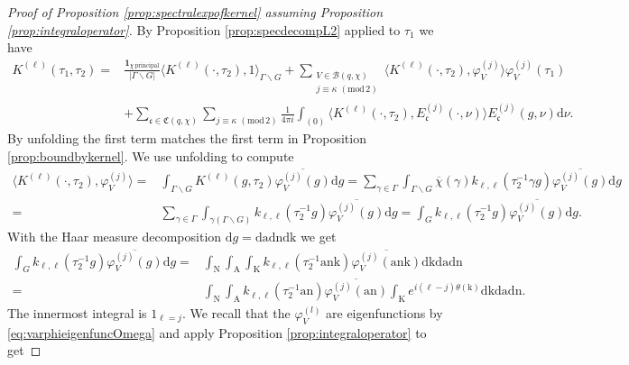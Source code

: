\documentclass[12pt]{amsart}
\theoremstyle{definition}
\theoremstyle{remark}
\numberwithin{equation}{section}
\newcommand{\1}{{\mathbf 1}}
\renewcommand{\k}{\mathrm{k}}
\renewcommand{\d}{\mathrm d}
\renewcommand{\pmod}[1]{\,\,(\mathrm{mod}\,{#1})}
\begin{document}
\begin{proof}[Proof of Proposition \ref{prop:spectralexpofkernel} assuming Proposition \ref{prop:integraloperator}]
 By Proposition \ref{prop:specdecompL2} applied to $\tau_1$ we have
\begin{align}\nonumber
  K^{(\ell)}(\tau_1,\tau_2) = &  \frac{\mathbf{1}_{\chi \,\mathrm{principal}}}{|\Gamma \backslash G|} \langle K^{(\ell)}(\cdot,\tau_2) ,1 \rangle_{\Gamma \backslash G} + \sum_{\substack{V\in \mathcal{B}(q,\chi)\\ j \equiv \kappa \pmod{2}}}  \langle    K^{(\ell)}(\cdot,\tau_2), \varphi_V^{(j)} \rangle  \varphi_V^{(j)}(\tau_1)   \\
 \label{eq:prop71proof1} &+\sum_{\mathfrak{c}\in \mathfrak{C}(q,\chi)} \sum_{j \equiv \kappa \pmod{2}} \frac{1}{4 \pi i} \int_{(0)} \langle  K^{(\ell)}(\cdot,\tau_2), E^{(j)}_{\mathfrak{c}}(\cdot,\nu) \rangle E^{(j)}_{\mathfrak{c}}(g,\nu) \d \nu.
\end{align}
By unfolding the first term matches the first term in Proposition \ref{prop:boundbykernel}. We use unfolding to compute
\begin{align*}
    \langle    K^{(\ell)}(\cdot,\tau_2), \varphi_V^{(j)} \rangle =& \int_{\Gamma \backslash G}  K^{(\ell)}(g,\tau_2) \overline{\varphi_V^{(j)}(g)} \d g = \sum_{\gamma \in \Gamma} \int_{\Gamma \backslash G} \overline{\chi}(\gamma) k_{\ell,\ell}(\tau_2^{-1} \gamma g) \overline{\varphi_V^{(j)}(g)} \d g \\
=& \sum_{\gamma \in \Gamma} \int_{\gamma (\Gamma \backslash G)}  k_{\ell,\ell}(\tau_2^{-1}  g) \overline{\varphi_V^{(j)}(g)} \d g =\int_{ G}  k_{\ell,\ell}(\tau_2^{-1}g) \overline{\varphi_V^{(j)}(g)} \d g.
\end{align*}
With the Haar measure decomposition $\d g=  \d \mathrm{a} \d\mathrm{n}\d\mathrm{k}$ we get
\begin{align*}
    \int_{ G}  k_{\ell,\ell}(\tau_2^{-1}g) \overline{\varphi_V^{(j)}(g)} \d g = &\int_{\mathrm{N}} \int_{\mathrm{A}} \int_{\mathrm{K}} k_{\ell,\ell}(\tau_2^{-1}\mathrm{a}\mathrm{n} \mathrm{k}) \overline{\varphi_V^{(j)}( \mathrm{a}\mathrm{n} \mathrm{k})}  \d \k \d \mathrm{a} \d \mathrm{n} \\
    =&\int_{\mathrm{N}} \int_{\mathrm{A}} k_{\ell,\ell}( \tau_2^{-1}\mathrm{a}\mathrm{n} ) \overline{\varphi_V^{(j)}(\mathrm{a} \mathrm{n} )} \int_{\mathrm{K}} e^{i(\ell - j )\theta(\mathrm{k})} \d \k \d \mathrm{a} \d \mathrm{n}.
\end{align*}
The innermost integral is $1_{\ell=j}$. We recall that the $\varphi_V^{(l)}$ are eigenfunctions by \eqref{eq:varphieigenfuncOmega} and apply Proposition \ref{prop:integraloperator} to get

\end{proof}
\end{document}
